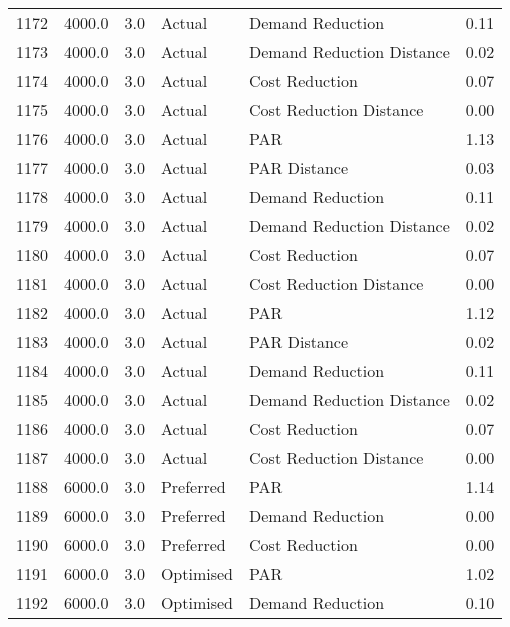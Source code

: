 \begin{longtable}{lrrllr}
1172 &       4000.0 &     3.0 &         Actual &           Demand Reduction &   0.11 \\
1173 &       4000.0 &     3.0 &         Actual &  Demand Reduction Distance &   0.02 \\
1174 &       4000.0 &     3.0 &         Actual &             Cost Reduction &   0.07 \\
1175 &       4000.0 &     3.0 &         Actual &    Cost Reduction Distance &   0.00 \\
1176 &       4000.0 &     3.0 &         Actual &                        PAR &   1.13 \\
1177 &       4000.0 &     3.0 &         Actual &               PAR Distance &   0.03 \\
1178 &       4000.0 &     3.0 &         Actual &           Demand Reduction &   0.11 \\
1179 &       4000.0 &     3.0 &         Actual &  Demand Reduction Distance &   0.02 \\
1180 &       4000.0 &     3.0 &         Actual &             Cost Reduction &   0.07 \\
1181 &       4000.0 &     3.0 &         Actual &    Cost Reduction Distance &   0.00 \\
1182 &       4000.0 &     3.0 &         Actual &                        PAR &   1.12 \\
1183 &       4000.0 &     3.0 &         Actual &               PAR Distance &   0.02 \\
1184 &       4000.0 &     3.0 &         Actual &           Demand Reduction &   0.11 \\
1185 &       4000.0 &     3.0 &         Actual &  Demand Reduction Distance &   0.02 \\
1186 &       4000.0 &     3.0 &         Actual &             Cost Reduction &   0.07 \\
1187 &       4000.0 &     3.0 &         Actual &    Cost Reduction Distance &   0.00 \\
1188 &       6000.0 &     3.0 &      Preferred &                        PAR &   1.14 \\
1189 &       6000.0 &     3.0 &      Preferred &           Demand Reduction &   0.00 \\
1190 &       6000.0 &     3.0 &      Preferred &             Cost Reduction &   0.00 \\
1191 &       6000.0 &     3.0 &      Optimised &                        PAR &   1.02 \\
1192 &       6000.0 &     3.0 &      Optimised &           Demand Reduction &   0.10 \\

\end{longtable}
